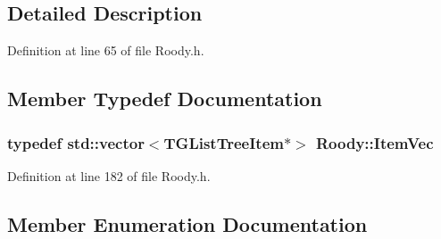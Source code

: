\subsection{Detailed Description}


Definition at line 65 of file Roody.h.



\subsection{Member Typedef Documentation}
\subsubsection[{ItemVec}]{\setlength{\rightskip}{0pt plus 5cm}typedef std::vector$<$TGListTreeItem$\ast$$>$ {\bf Roody::ItemVec}\hspace{0.3cm}{\ttfamily  [protected]}}\label{classRoody_a30e74959b7c8f262000dbdddb19a80bb}


Definition at line 182 of file Roody.h.



\subsection{Member Enumeration Documentation}
